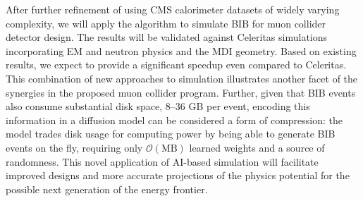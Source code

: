 After further refinement of \diffu using CMS calorimeter datasets of widely varying complexity,
we will apply the algorithm to simulate BIB for muon collider detector design.
The results will be validated against Celeritas simulations incorporating EM and neutron physics and the MDI geometry.
Based on existing results, we expect \diffu to provide a significant speedup even compared to Celeritas.
This combination of new approaches to simulation illustrates another facet of the synergies in the proposed muon collider program.
Further, given that BIB events also consume substantial disk space, 8--36 GB per event,
encoding this information in a diffusion model can be considered a form of compression:
the model trades disk usage for computing power by being able to generate BIB events on the fly,
requiring only $\mathcal{O}(\text{MB})$ learned weights and a source of randomness.
This novel application of AI-based simulation will facilitate improved designs and
more accurate projections of the physics potential for the possible next generation of the energy frontier.